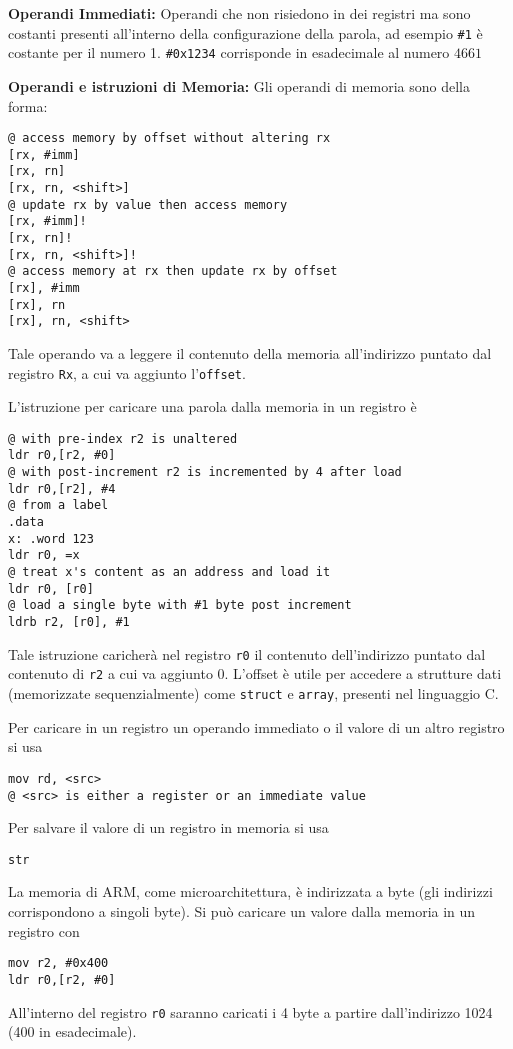 \begin{defn}
\textbf{Operandi Immediati:}
Operandi che non risiedono in dei registri ma sono costanti
presenti all'interno della configurazione della parola, ad 
esempio \texttt{\#1} è costante per il numero 1. 
\texttt{\#0x1234} corrisponde in esadecimale al numero $ 4661 $
\end{defn}

\begin{defn}
\textbf{Operandi e istruzioni di Memoria:}
Gli operandi di memoria sono della forma:
\begin{lstlisting}[style=arm]
@ access memory by offset without altering rx
[rx, #imm]
[rx, rn]
[rx, rn, <shift>]
@ update rx by value then access memory
[rx, #imm]!
[rx, rn]!
[rx, rn, <shift>]!
@ access memory at rx then update rx by offset
[rx], #imm
[rx], rn
[rx], rn, <shift>
\end{lstlisting}

Tale operando va a leggere il contenuto della memoria all'indirizzo puntato dal registro \texttt{Rx}, a cui va aggiunto l'\texttt{offset}.

L'istruzione per caricare una parola dalla memoria in un registro è
\begin{lstlisting}[style=arm]
@ with pre-index r2 is unaltered
ldr r0,[r2, #0]
@ with post-increment r2 is incremented by 4 after load
ldr r0,[r2], #4
@ from a label
.data
x: .word 123
ldr r0, =x
@ treat x's content as an address and load it
ldr r0, [r0]
@ load a single byte with #1 byte post increment
ldrb r2, [r0], #1
\end{lstlisting}

Tale istruzione caricherà nel registro \texttt{r0} il contenuto dell'indirizzo puntato dal contenuto di \texttt{r2} a cui va aggiunto 0. L'offset è utile per accedere a strutture dati (memorizzate sequenzialmente) come \texttt{struct} e \texttt{array}, presenti nel linguaggio C.

Per caricare in un registro un operando immediato o il valore di un altro registro si usa
\begin{lstlisting}[style=arm]
mov rd, <src>
@ <src> is either a register or an immediate value
\end{lstlisting}

Per salvare il valore di un registro in memoria si usa
\begin{lstlisting}[style=arm]
str
\end{lstlisting}
\end{defn}

\begin{note}
La memoria di ARM, come microarchitettura, è indirizzata a byte (gli indirizzi corrispondono a singoli byte). Si può caricare un valore dalla memoria in un registro con
\begin{lstlisting}[style=arm]
mov r2, #0x400
ldr r0,[r2, #0]
\end{lstlisting}

All'interno del registro \texttt{r0} saranno caricati i 4 byte a partire dall'indirizzo 1024 (400 in esadecimale).
\end{note}

